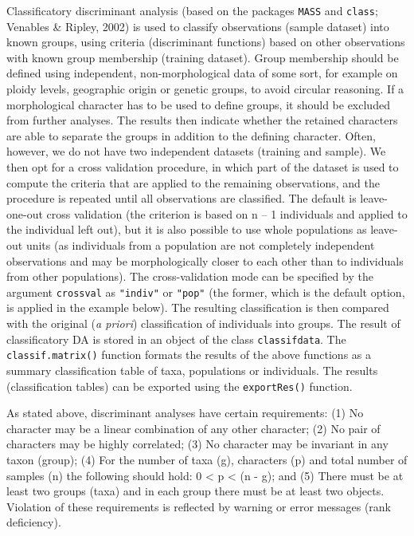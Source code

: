\documentclass[
  11pt,
  a4paper]{article}
\begin{document}
Classificatory discriminant analysis (based on the packages
\texttt{MASS} and \texttt{class}; Venables \& Ripley, 2002) is used to
classify observations (sample dataset) into known groups, using criteria
(discriminant functions) based on other observations with known group
membership (training dataset). Group membership should be defined using
independent, non-morphological data of some sort, for example on ploidy
levels, geographic origin or genetic groups, to avoid circular
reasoning. If a morphological character has to be used to define groups,
it should be excluded from further analyses. The results then indicate
whether the retained characters are able to separate the groups in
addition to the defining character. Often, however, we do not have two
independent datasets (training and sample). We then opt for a cross
validation procedure, in which part of the dataset is used to compute
the criteria that are applied to the remaining observations, and the
procedure is repeated until all observations are classified. The default
is leave-one-out cross validation (the criterion is based on n -- 1
individuals and applied to the individual left out), but it is also
possible to use whole populations as leave-out units (as individuals
from a population are not completely independent observations and may be
morphologically closer to each other than to individuals from other
populations). The cross-validation mode can be specified by the argument
\texttt{crossval} as \texttt{"indiv"} or \texttt{"pop"} (the former,
which is the default option, is applied in the example below). The
resulting classification is then compared with the original (\emph{a
priori}) classification of individuals into groups. The result of
classificatory DA is stored in an object of the class
\texttt{classifdata}. The \texttt{classif.matrix()} function formats the
results of the above functions as a summary classification table of
taxa, populations or individuals. The results (classification tables)
can be exported using the \texttt{exportRes()} function.

As stated above, discriminant analyses have certain requirements: (1) No
character may be a linear combination of any other character; (2) No
pair of characters may be highly correlated; (3) No character may be
invariant in any taxon (group); (4) For the number of taxa (g),
characters (p) and total number of samples (n) the following should
hold: 0 \textless{} p \textless{} (n - g); and (5) There must be at
least two groups (taxa) and in each group there must be at least two
objects. Violation of these requirements is reflected by warning or
error messages (rank deficiency).
\end{document}
